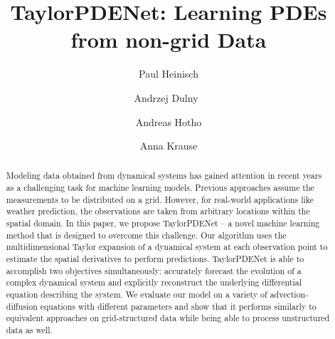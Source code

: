 \documentclass[runningheads]{llncs}
\begin{document}
%
\title{TaylorPDENet: Learning PDEs from non-grid Data}
%

\author{Paul Heinisch \and
Andrzej Dulny~\Letter \and
Andreas Hotho \and
Anna Krause}

%
%

%
%

\maketitle              %
%
\begin{abstract}
Modeling data obtained from dynamical systems has gained attention in recent years as a challenging task for machine learning models.
Previous approaches assume the measurements to be distributed on a grid.
However, for real-world applications like weather prediction, the observations are taken from arbitrary locations within the spatial domain.
In this paper, we propose TaylorPDENet -- a novel machine learning method that is designed to overcome this challenge.
Our algorithm uses the multidimensional Taylor expansion of a dynamical system at each observation point to estimate the spatial derivatives to perform predictions.
TaylorPDENet is able to accomplish two objectives simultaneously: accurately forecast the evolution of a complex dynamical system and explicitly reconstruct the underlying differential equation describing the system.
We evaluate our model on a variety of advection-diffusion equations with different parameters and show that it performs similarly to equivalent approaches on grid-structured data while being able to process unstructured data as well.
 
\end{abstract}
%
%
%
\end{document}
